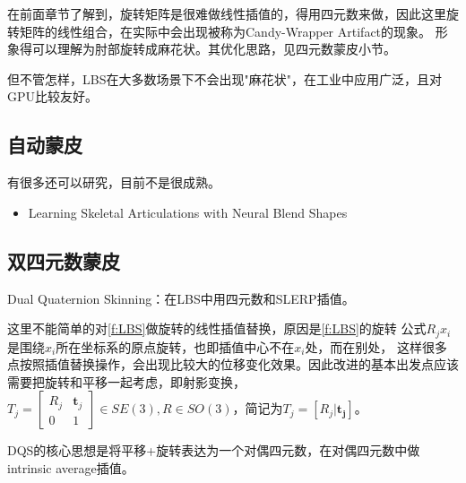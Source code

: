 \documentclass[lang=cn,newtx,10pt,scheme=chinese]{elegantbook}
\begin{document}
在前面章节了解到，旋转矩阵是很难做线性插值的，得用四元数来做，因此这里旋转矩阵的线性组合，在实际中会出现被称为Candy-Wrapper Artifact的现象。
形象得可以理解为肘部旋转成麻花状。其优化思路，见四元数蒙皮小节。

但不管怎样，LBS在大多数场景下不会出现"麻花状"，在工业中应用广泛，且对GPU比较友好。
\subsection{自动蒙皮}
有很多还可以研究，目前不是很成熟。
\begin{itemize}
  \item Learning Skeletal Articulations with Neural Blend Shapes
\end{itemize}

\subsection{双四元数蒙皮}
Dual Quaternion Skinning：在LBS中用四元数和SLERP插值。

这里不能简单的对\ref{f:LBS}做旋转的线性插值替换，原因是\ref{f:LBS}的旋转
公式$R_j x_i$是围绕$x_i$所在坐标系的原点旋转，也即插值中心不在$x_i$处，而在别处，
这样很多点按照插值替换操作，会出现比较大的位移变化效果。因此改进的基本出发点应该
需要把旋转和平移一起考虑，即射影变换，
$T_j=\left[\begin{array}{cc}R_j & \boldsymbol{t}_j \\ 0 & 1\end{array}\right] 
\in SE(3), R \in SO(3)$，简记为$T_j = [R_j | \boldsymbol{t_j}]$。

DQS的核心思想是将平移+旋转表达为一个对偶四元数，在对偶四元数中做intrinsic average插值。
\end{document}
